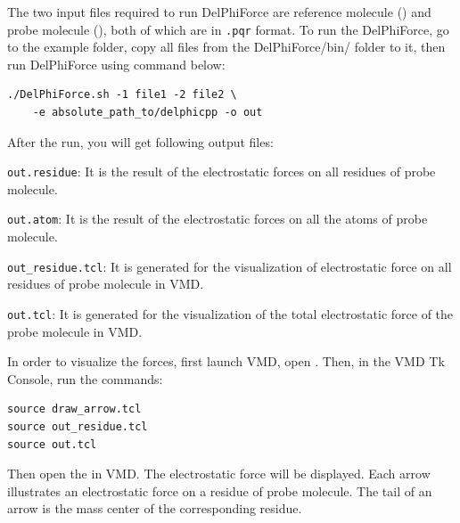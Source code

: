 \documentclass[9pt,tutorial]{livecoms}
\newcommand*\ttvar[1]{\texttt{\expandafter\dottvar\detokenize{#1}\relax}}
\newcommand*\dottvar[1]{\ifx\relax#1\else
  \expandafter\ifx\string_#1\string_\allowbreak\else#1\fi
  \expandafter\dottvar\fi}
\begin{document}
The two input files required to run DelPhiForce are reference molecule (\ttvar{file1}) and probe molecule (\ttvar{file2}), both of which are in \texttt{.pqr} format. To run the DelPhiForce, go to the example folder, copy all files from the DelPhiForce/bin/ folder to it, then run DelPhiForce using command below:

\begin{verbatim}
./DelPhiForce.sh -1 file1 -2 file2 \
    -e absolute_path_to/delphicpp -o out
\end{verbatim}

After the run, you will get following output files:

\texttt{out.residue}: It is the result of the electrostatic forces on all residues of probe molecule.

\texttt{out.atom}: It is the result of the electrostatic forces on all the atoms of probe molecule.

\texttt{out\_residue.tcl}: It is generated for the visualization of electrostatic force on all residues of probe molecule in VMD\cite{humphrey1996vmd}.

\texttt{out.tcl}: It is generated for the visualization of the total electrostatic force of the probe molecule in VMD\cite{humphrey1996vmd}.

In order to visualize the forces, first launch VMD, open \ttvar{file2}. Then, in the VMD Tk Console, run the commands: 

\begin{verbatim}
source draw_arrow.tcl
source out_residue.tcl
source out.tcl
\end{verbatim}

Then open the \ttvar{file1} in VMD. The electrostatic force will be displayed.  Each arrow illustrates an electrostatic force on a residue of probe molecule. The tail of an arrow is the mass center of the corresponding residue. 
\end{document}
